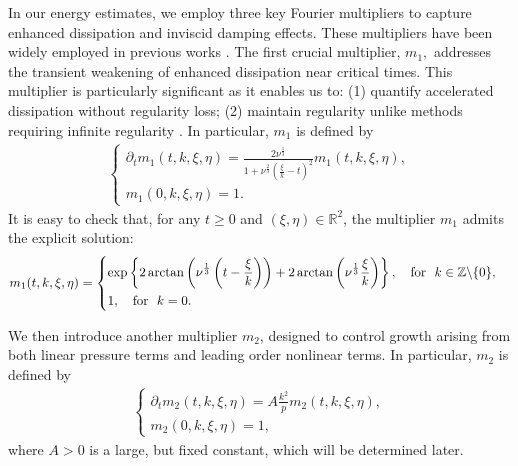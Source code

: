 \documentclass[11pt,reqno]{article}
\numberwithin{equation}{section}
\newcommand\R{{\mathbb R}}
\newcommand\Z{{\mathbb Z}}
\newcommand \tri {\coloneqq}
\let\pa=\partial
\let\f=\frac
\def\exp{\mathop{\rm exp}\nolimits}
\begin{document}
In our energy estimates, we employ three key Fourier multipliers to capture enhanced dissipation and inviscid damping effects. 
These multipliers have been widely employed in previous works \cite{Bedrossian-Germain-Masmoudi-2017,Bedrossian-Germain-Masmoudi-2019,Bedrossian-Masmoudi-Vicol-2016,Zillinger-2017}.
The first crucial multiplier, $m_1,$ addresses the transient weakening of enhanced dissipation near critical times. 
This multiplier is particularly significant as it enables us to: (1) quantify accelerated dissipation without regularity loss; %
(2) maintain regularity unlike methods requiring infinite regularity \cite{Bedrossian-Germain-Masmoudi-2020,Bedrossian-Masmoudi-Vicol-2016}.
In particular, $m_1$ is defined by
\begin{align}\label{def-m1}
\left\{\begin{array}{l}
	\displaystyle
	\pa_{t}m_1(t,k,\xi,\eta)
	=\f{2\nu^{\f13}}{1+\nu^{\f23}(\f{\xi}{k}-t)^2}m_1(t,k,\xi,\eta),
	\\[1ex]
	\displaystyle
	m_1(0,k,\xi,\eta)=1.
\end{array}\right.
\end{align}
It is easy to check that, for any $t\geq0$ and $(\xi,\eta)\in\R^2$, the multiplier $m_1$ admits the explicit solution:
\begin{align*}
&m_1(t,k,\xi,\eta)=
\begin{dcases}
	\exp\left\{2\arctan \left(\nu^{\f13}\left(t-\f{\xi}{k}\right)\right)+2\arctan \left(\nu^{\f13}\f{\xi}{k}\right)\right\},\quad \text{for}~~k\in\Z\backslash\{0\},\\
	1,\quad\text{for}~~k=0.
\end{dcases}
\end{align*}

We then introduce another multiplier $m_2$, designed to control growth arising from both linear pressure terms and leading order nonlinear terms.
In particular, $m_2$ is defined by
\begin{align}\label{def-m2}
\left\{\begin{array}{l}
	\displaystyle
	\pa_{t}m_2(t,k,\xi,\eta)
	=A\f{k^2}{p}m_2(t,k,\xi,\eta),
	\\[1ex]
	\displaystyle
	m_2(0,k,\xi,\eta)=1,
\end{array}\right.
\end{align}
where 
$A>0$ is a large, but fixed constant, which will be determined later.
\end{document}
